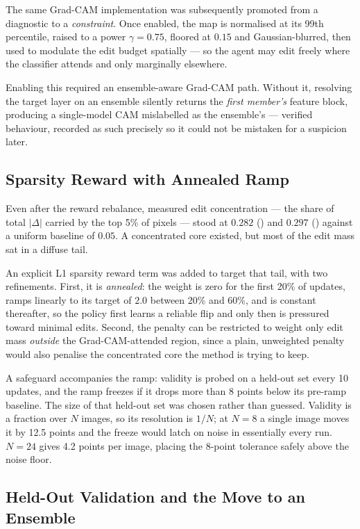 The same Grad-CAM implementation was subsequently promoted from a
diagnostic to a \emph{constraint}. Once enabled, the map is normalised at
its 99th percentile, raised to a power $\gamma = 0.75$, floored at $0.15$
and Gaussian-blurred, then used to modulate the edit budget spatially ---
so the agent may edit freely where the classifier attends and only
marginally elsewhere.

Enabling this required an ensemble-aware Grad-CAM path. Without it,
resolving the target layer on an ensemble silently returns the \emph{first
member's} feature block, producing a single-model CAM mislabelled as the
ensemble's --- verified behaviour, recorded as such precisely so it could
not be mistaken for a suspicion later.

\subsection{Sparsity Reward with Annealed Ramp}

Even after the reward rebalance, measured edit concentration --- the
share of total $|\Delta|$ carried by the top 5\% of pixels --- stood at
$0.282$ (\ntop{}) and $0.297$ (\pton{}) against a uniform baseline of
$0.05$. A concentrated core existed, but most of the edit mass sat in a
diffuse tail.

An explicit L1 sparsity reward term was added to target that tail, with
two refinements. First, it is \emph{annealed}: the weight is zero for the
first 20\% of updates, ramps linearly to its target of $2.0$ between 20\%
and 60\%, and is constant thereafter, so the policy first learns a
reliable flip and only then is pressured toward minimal edits. Second,
the penalty can be restricted to weight only edit mass \emph{outside} the
Grad-CAM-attended region, since a plain, unweighted penalty would also
penalise the concentrated core the method is trying to keep.

A safeguard accompanies the ramp: validity is probed on a held-out set
every 10 updates, and the ramp freezes if it drops more than 8 points
below its pre-ramp baseline. The size of that held-out set was chosen
rather than guessed. Validity is a fraction over $N$ images, so its
resolution is $1/N$; at $N=8$ a single image moves it by 12.5 points and
the freeze would latch on noise in essentially every run. $N=24$ gives
4.2 points per image, placing the 8-point tolerance safely above the
noise floor.

\subsection{Held-Out Validation and the Move to an Ensemble}
\label{sec:heldout_method}

